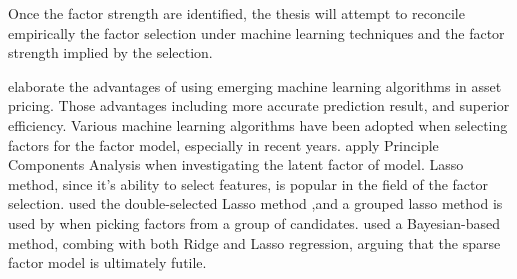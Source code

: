 Once the factor strength are identified, the thesis will attempt to reconcile empirically the factor selection under machine learning techniques and the factor strength implied by the selection.

 elaborate the advantages of using emerging machine learning algorithms in asset pricing.
Those advantages including more accurate prediction result, and superior efficiency.
Various machine learning algorithms have been adopted when selecting factors for the factor model, especially in recent years.
 apply Principle Components Analysis when investigating the latent factor of model. 
Lasso method, since it's ability to select features, is popular in the field of the factor selection.
 used the double-selected Lasso method \cite{Belloni2014},and a grouped lasso method \cite{Huang2010} is used by  when picking factors from a group of candidates. 
 used a Bayesian-based method, combing with both Ridge and Lasso regression, arguing that the sparse factor model is ultimately futile. 
